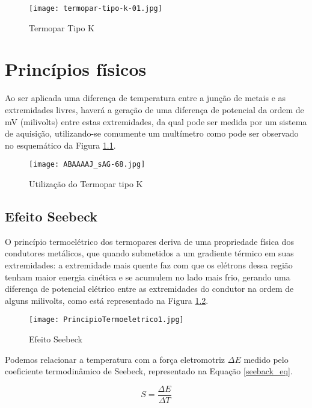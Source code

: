 \documentclass[a4paper,12pt]{report}
\begin{document}
	\begin{figure}[htbp]
		\centering
		\texttt{[image: termopar-tipo-k-01.jpg]}
		\caption{Termopar Tipo K}
		\label{real}
	\end{figure}
	
	\chapter{Princípios físicos}
	Ao ser aplicada uma diferença de temperatura entre a junção de metais e as extremidades livres, haverá a geração de uma diferença de potencial da ordem de mV (milivolts) entre estas extremidades, da qual pode ser medida por um sistema de aquisição, utilizando-se comumente um multímetro como pode ser observado no esquemático da Figura \ref{esquematico}.
	
	\hfill \break
	\hfill \break
	
	\begin{figure}[htbp]
		\centering
		\texttt{[image: ABAAAAJ\_sAG-68.jpg]}
		\caption{Utilização do Termopar tipo K}
		\label{esquematico}
	\end{figure}
	
	\pagebreak
	
	\section{Efeito Seebeck}
	
	O princípio termoelétrico dos termopares deriva de uma propriedade física dos condutores metálicos, que quando  submetidos a um gradiente térmico em suas extremidades: a extremidade mais quente faz com que os elétrons dessa região tenham maior energia cinética e se acumulem no lado mais frio, gerando uma diferença de potencial elétrico entre as extremidades do condutor na ordem de alguns milivolts, como está representado na Figura \ref{seebeck}.
	
	\begin{figure}[htbp]
		\centering
		\texttt{[image: PrincipioTermoeletrico1.jpg]}
		\caption{Efeito Seebeck}
		\label{seebeck}
	\end{figure}
	
	\noindent Podemos relacionar a temperatura com a força eletromotriz $\Delta E$ medido pelo coeficiente termodinâmico de Seebeck, representado na Equação \ref{seeback_eq}.
	
	\begin{equation}
	S = \frac{\Delta E}{\Delta T}
	\label{seeback_eq}
	\end{equation}  
	
\end{document}
